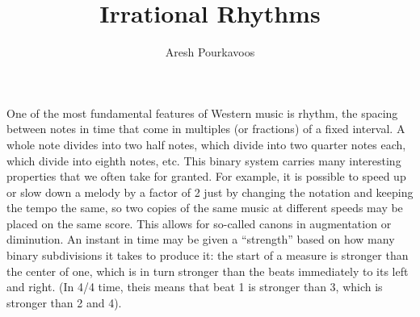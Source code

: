 \documentclass{article}
\begin{document}
\title{Irrational Rhythms}
\author{Aresh Pourkavoos}
\maketitle

One of the most fundamental features of Western music is rhythm,
the spacing between notes in time
that come in multiples (or fractions) of a fixed interval.
A whole note divides into two half notes,
which divide into two quarter notes each,
which divide into eighth notes, etc.
This binary system carries many interesting properties
that we often take for granted.
For example, it is possible to speed up or slow down a melody by a factor of 2
just by changing the notation and keeping the tempo the same,
so two copies of the same music at different speeds may be placed on the same score.
This allows for so-called canons in augmentation or diminution.
An instant in time may be given a ``strength''
based on how many binary subdivisions it takes to produce it:
the start of a measure is stronger than the center of one,
which is in turn stronger than the beats immediately to its left and right.
(In 4/4 time, theis means that beat 1 is stronger than 3,
which is stronger than 2 and 4).
\end{document}
